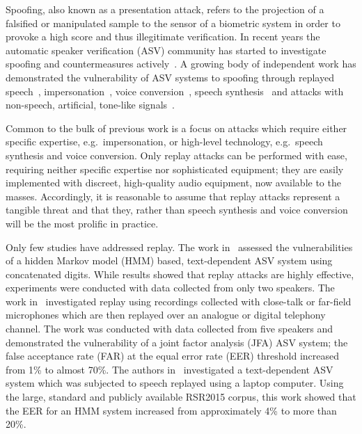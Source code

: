 
Spoofing, also known as a presentation attack, refers to the projection of a falsified or manipulated sample 
to the sensor of a biometric system in order to provoke a high score and 
thus illegitimate verification.
In recent years the automatic speaker verification (ASV) community has 
started to investigate spoofing and countermeasures 
actively~\cite{interspeechSpecialSession, Wu2014a}. 
A growing 
body of independent work has demonstrated the vulnerability of ASV 
systems to spoofing through 
replayed speech~\cite{Lindberg1999,Villalba2010},
impersonation~\cite{Blomberg2004,Farrus2008}, voice 
conversion~\cite{Perrot2005, Pellom1999}, speech 
synthesis~\cite{Masuko1999, Leon2010} and attacks with non-speech, 
artificial, tone-like signals~\cite{Alegre2012a,Alegre2012b}.

Common to the bulk of previous work is a focus on attacks 
which require either specific expertise, e.g.~impersonation, or high-level 
technology, e.g.~speech synthesis and voice conversion. 
Only replay attacks can be performed with ease, requiring neither specific 
expertise nor sophisticated equipment; they are easily 
implemented %
with discreet, high-quality audio equipment, now available to the masses.
Accordingly, it is reasonable to assume that replay attacks represent a tangible threat and that they, rather than speech synthesis and voice conversion will be the most prolific in practice.  


Only few studies have addressed replay.  
The work in~\cite{Lindberg1999} assessed the vulnerabilities of a hidden Markov model (HMM) based, text-dependent ASV system using concatenated digits.  
While results showed that replay attacks are highly effective, experiments were conducted with data collected from only two speakers.
The work in~\cite{Villalba2010} investigated replay using recordings collected with close-talk or far-field microphones which are then replayed over an analogue or digital telephony channel. 
The work was conducted with data collected from five speakers and demonstrated the vulnerability of a joint factor analysis (JFA) ASV system; the false acceptance rate (FAR) at the equal error rate (EER) threshold increased from 1\% to almost 70\%. 
The authors in~\cite{Wu2014} investigated a text-dependent 
ASV system which was subjected to speech replayed using a laptop computer. 
Using the large, standard and publicly available RSR2015 corpus, this work showed that the EER for an HMM system increased from approximately 4\% to more than 20\%. 


